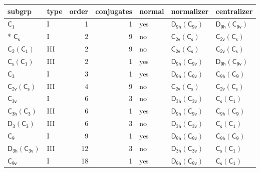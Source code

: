 \documentclass[10pt,a4paper]{article}
\numberwithin{equation}{section}
\newcommand{\grp}[1]{\mathsf{#1}}
\begin{document}
{\small\begin{longtable}{@{}llrrlll@{}}\toprule
subgrp & type & order & conjugates & normal & normalizer & centralizer\\\midrule\endhead
\bottomrule\endfoot\endlastfoot
\href{../../../rotation/data/pdf/C1.pdf}{$\grp{C_{1}}$} & I & 1 & 1 & yes & \href{D9h-C9v.pdf}{$\grp{D_{9h}}(\grp{C_{9v}})$} & \href{D9h-C9v.pdf}{$\grp{D_{9h}}(\grp{C_{9v}})$}\\*
\href{../../../rotation/data/pdf/C1v.pdf}{$\grp{C_{s}}$} & I & 2 & 9 & no & \href{C2v-C1v.pdf}{$\grp{C_{2v}}(\grp{C_{s}})$} & \href{C2v-C1v.pdf}{$\grp{C_{2v}}(\grp{C_{s}})$}\\
\href{C2-C1.pdf}{$\grp{C_{2}}(\grp{C_{1}})$} & III & 2 & 9 & no & \href{C2v-C1v.pdf}{$\grp{C_{2v}}(\grp{C_{s}})$} & \href{C2v-C1v.pdf}{$\grp{C_{2v}}(\grp{C_{s}})$}\\
\href{C1v-C1.pdf}{$\grp{C_{s}}(\grp{C_{1}})$} & III & 2 & 1 & yes & \href{D9h-C9v.pdf}{$\grp{D_{9h}}(\grp{C_{9v}})$} & \href{D9h-C9v.pdf}{$\grp{D_{9h}}(\grp{C_{9v}})$}\\
\href{../../../rotation/data/pdf/C3.pdf}{$\grp{C_{3}}$} & I & 3 & 1 & yes & \href{D9h-C9v.pdf}{$\grp{D_{9h}}(\grp{C_{9v}})$} & \href{C9h-C9.pdf}{$\grp{C_{9h}}(\grp{C_{9}})$}\\
\href{C2v-C1v.pdf}{$\grp{C_{2v}}(\grp{C_{s}})$} & III & 4 & 9 & no & \href{C2v-C1v.pdf}{$\grp{C_{2v}}(\grp{C_{s}})$} & \href{C2v-C1v.pdf}{$\grp{C_{2v}}(\grp{C_{s}})$}\\
\href{../../../rotation/data/pdf/C3v.pdf}{$\grp{C_{3v}}$} & I & 6 & 3 & no & \href{D3h-C3v.pdf}{$\grp{D_{3h}}(\grp{C_{3v}})$} & \href{C1v-C1.pdf}{$\grp{C_{s}}(\grp{C_{1}})$}\\
\href{C3h-C3.pdf}{$\grp{C_{3h}}(\grp{C_{3}})$} & III & 6 & 1 & yes & \href{D9h-C9v.pdf}{$\grp{D_{9h}}(\grp{C_{9v}})$} & \href{C9h-C9.pdf}{$\grp{C_{9h}}(\grp{C_{9}})$}\\
\href{D3-C3.pdf}{$\grp{D_{3}}(\grp{C_{3}})$} & III & 6 & 3 & no & \href{D3h-C3v.pdf}{$\grp{D_{3h}}(\grp{C_{3v}})$} & \href{C1v-C1.pdf}{$\grp{C_{s}}(\grp{C_{1}})$}\\
\href{../../../rotation/data/pdf/C9.pdf}{$\grp{C_{9}}$} & I & 9 & 1 & yes & \href{D9h-C9v.pdf}{$\grp{D_{9h}}(\grp{C_{9v}})$} & \href{C9h-C9.pdf}{$\grp{C_{9h}}(\grp{C_{9}})$}\\
\href{D3h-C3v.pdf}{$\grp{D_{3h}}(\grp{C_{3v}})$} & III & 12 & 3 & no & \href{D3h-C3v.pdf}{$\grp{D_{3h}}(\grp{C_{3v}})$} & \href{C1v-C1.pdf}{$\grp{C_{s}}(\grp{C_{1}})$}\\
\href{../../../rotation/data/pdf/C9v.pdf}{$\grp{C_{9v}}$} & I & 18 & 1 & yes & \href{D9h-C9v.pdf}{$\grp{D_{9h}}(\grp{C_{9v}})$} & \href{C1v-C1.pdf}{$\grp{C_{s}}(\grp{C_{1}})$}\\

\end{longtable}}
\end{document}
